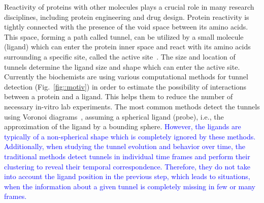 \documentclass[usletter, 10pt, conference]{ieeeconf} %
\begin{document}
Reactivity of proteins with other molecules plays a crucial role in many research disciplines, including protein engineering and drug design.
Protein reactivity is tightly connected with the presence of the void space between its amino acids. 
This space, forming a path called tunnel, can be utilized by a small molecule (ligand) which can enter the protein inner space and react with its amino acids surrounding a specific site, called the active site~\cite{gora2013gates}.
The size and location of tunnels determine the ligand size and shape which can enter the active site.
Currently the biochemists are using various computational methods for tunnel detection (Fig.~\ref{fig::motiv}) in order to estimate the possibility of interactions between a protein and a ligand.
This helps them to reduce the number of necessary in-vitro lab experiments.
The most common methods detect the tunnels using Voronoi diagrams~\cite{yaffe2008,caver3}, assuming a spherical ligand (probe), i.e., the approximation of the ligand by a bounding sphere.
\textcolor{blue}{However, the ligands are typically of a non-spherical shape which is completely ignored by these methods. 
Additionally, when studying the tunnel evolution and behavior over time, the traditional methods detect tunnels in individual time frames and perform their clustering to reveal their temporal correspondence. 
Therefore, they do not take into account the ligand position in the previous step, which leads to situations, when the information about a given tunnel is completely missing in few or many frames.}
\end{document}
